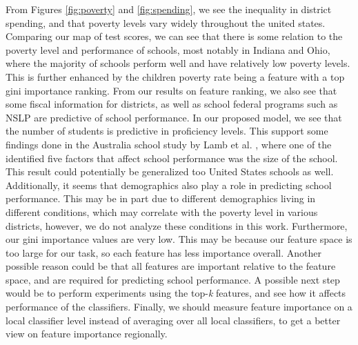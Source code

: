 From Figures \ref{fig:poverty} and \ref{fig:spending}, we see the inequality in district spending, and that poverty levels vary widely throughout the united states. Comparing our map of test scores, we can see that there is some relation to the poverty level and performance of schools, most notably in Indiana and Ohio, where the majority of schools perform well and have relatively low poverty levels. This is further enhanced by the children poverty rate being a feature with a top gini importance ranking. From our results on feature ranking, we also see that some fiscal information for districts, as well as school federal programs such as NSLP are predictive of school performance. In our proposed model, we see that the number of students is predictive in proficiency levels. This support some findings done in the Australia school study by Lamb et al. \cite{australiaschool2004}, where one of the identified five factors that affect school performance was the size of the school. This result could potentially be generalized too United States schools as well. Additionally, it seems that demographics also play a role in predicting school performance. This may be in part due to different demographics living in different conditions, which may correlate with the poverty level in various districts, however, we do not analyze these conditions in this work. Furthermore, our gini importance values are very low. This may be because our feature space is too large for our task, so each feature has less importance overall. Another possible reason could be that all features are important relative to the feature space, and are required for predicting school performance. A possible next step would be to perform experiments using the top-\textit{k} features, and see how it affects performance of the classifiers. Finally, we should measure feature importance on a local classifier level instead of averaging over all local classifiers, to get a better view on feature importance regionally.

